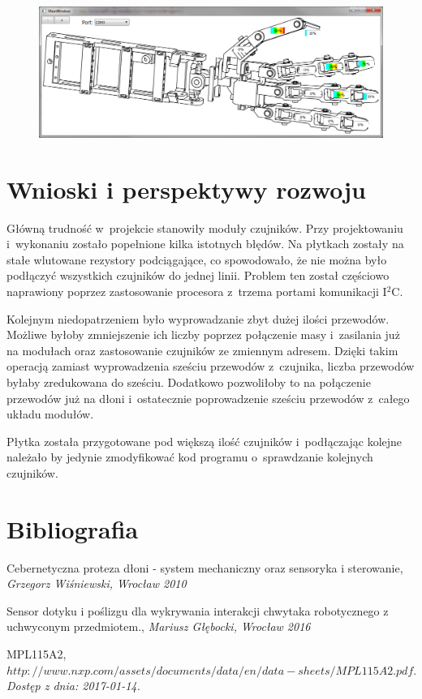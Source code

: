 \documentclass[a4paper,12pt]{article}
\begin{document}
	\begin{figure}[H]
		     	 \includegraphics[width=1\textwidth]{obrazy/wizualizacja.png}
			\end{figure}
			
	\section{Wnioski i perspektywy rozwoju}
		Główną trudność w~projekcie stanowiły moduły czujników. Przy projektowaniu i~wykonaniu zostało popełnione kilka istotnych błędów. Na płytkach zostały na stałe wlutowane rezystory podciągające, co spowodowało, że nie można było podłączyć wszystkich czujników do jednej linii. Problem ten został częściowo naprawiony poprzez zastosowanie procesora z~trzema portami komunikacji I$^2$C.
		
		 Kolejnym niedopatrzeniem było wyprowadzanie zbyt dużej ilości przewodów. Możliwe byłoby zmniejszenie ich liczby poprzez połączenie masy i~zasilania już na modułach oraz zastosowanie czujników ze zmiennym adresem. Dzięki takim operacją zamiast wyprowadzenia sześciu przewodów z~czujnika, liczba przewodów byłaby zredukowana do sześciu. Dodatkowo pozwoliłoby to na połączenie przewodów już na dłoni i~ostatecznie poprowadzenie sześciu przewodów z~całego układu modułów.
		
		Płytka została przygotowane pod większą ilość czujników i~podłączając kolejne należało by jedynie zmodyfikować kod programu o~sprawdzanie kolejnych czujników.
	
	\section{Bibliografia}
\begin{thebibliography}{99}

 Cebernetyczna proteza dłoni - system mechaniczny oraz sensoryka i sterowanie,
\textit {Grzegorz Wiśniewski, Wrocław 2010}

 Sensor dotyku i poślizgu dla wykrywania interakcji chwytaka robotycznego z uchwyconym przedmiotem.,
\textit {Mariusz Głębocki, Wrocław 2016}

 MPL115A2,
\textit {$http://www.nxp.com/assets/documents/data/en/data-sheets/MPL115A2.pdf.$ Dostęp z dnia: 2017-01-14.}






\end{thebibliography}
	
	
\end{document}
